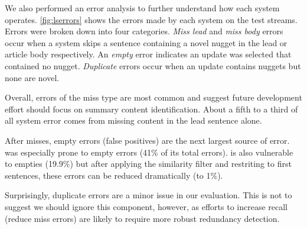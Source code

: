  

  We also performed an error analysis to further understand how each system
 operates.  \autoref{fig:lserrors} shows the errors made by each system on
 the test streams.  Errors were broken down into four categories. \emph{Miss
 lead} and \emph{miss body} errors occur when a system skips a sentence
 containing a novel nugget in the lead or article body respectively. An
 \emph{empty} error indicates an update was selected that contained no nugget.
 \emph{Duplicate} errors occur when an update contains nuggets but none are
 novel. 
 
  Overall, errors of the miss type are most common and suggest future
 development effort should focus on summary content identification.  About a
 fifth to a third of all system error comes from missing content in the lead
 sentence alone.
 
  After misses, empty errors (false positives) are the next largest source of
  error. \modelCos{} was especially prone to empty errors (41\% of its total
  errors). \modelLS{} is also vulnerable to empties (19.9\%) but after
 applying the similarity filter and restriting to first sentences, these
 errors can be reduced dramatically (to 1\%).
  
  Surprisingly, duplicate errors are a minor issue in our evaluation. This is
 not to suggest we should ignore this component, however, as efforts to
 increase recall (reduce miss errors) are likely to require more robust
 redundancy detection. 

